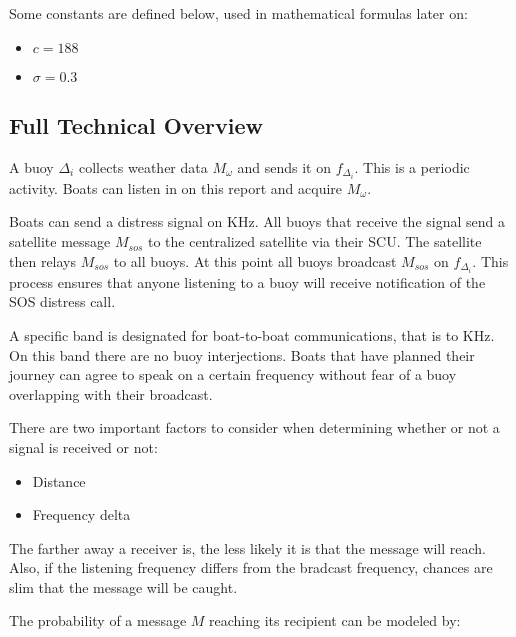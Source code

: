 \documentclass{article}
\begin{document}
		\bigskip

		Some constants are defined below, used in mathematical formulas later on:

		\begin{itemize}
			\item[] $c = 188$
			\item[] $\sigma = 0.3$
		\end{itemize}

	\subsection{Full Technical Overview}

		A buoy $\Delta_{i}$ collects weather data $M_{\omega}$ and sends it on $f_{\Delta_{i}}$. This is a periodic activity. Boats can listen in on this report and acquire $M_{\omega}$.

		\bigskip

		Boats can send a distress signal on \fsos KHz. All buoys that receive the signal send a satellite message $M_{sos}$ to the centralized satellite via their SCU. The satellite then relays $M_{sos}$ to all buoys. At this point all buoys broadcast $M_{sos}$ on $f_{\Delta_{i}}$. This process ensures that anyone listening to a buoy will receive notification of the SOS distress call.

		\bigskip

		A specific band is designated for boat-to-boat communications, that is \fbl to \fbh KHz. On this band there are no buoy interjections. Boats that have planned their journey can agree to speak on a certain frequency without fear of a buoy overlapping with their broadcast.

		\bigskip

		There are two important factors to consider when determining whether or not a signal is received or not:

		\begin{itemize}
			\item Distance
			\item Frequency delta
		\end{itemize}

		The farther away a receiver is, the less likely it is that the message will reach. Also, if the listening frequency differs from the bradcast frequency, chances are slim that the message will be caught.

		\bigskip

		The probability of a message $M$ reaching its recipient can be modeled by:
\end{document}
